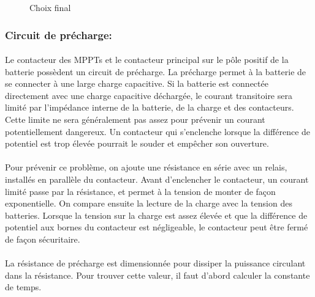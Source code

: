 		\begin{figure}[H]
			\centering
			\caption{Choix final}
			\label{fig:contactorsolfinal}
		\end{figure}

	\newpage

	\subsubsection*{Circuit de précharge:}
		\paragraph*{}
		Le contacteur des MPPTs et le contacteur principal sur le pôle positif de la batterie possèdent un circuit de précharge. La précharge permet à la batterie de se connecter à une large charge capacitive. Si la batterie est connectée directement avec une charge capacitive déchargée, le courant transitoire sera limité par l'impédance interne de la batterie, de la charge et des contacteurs. Cette limite ne sera généralement pas assez pour prévenir un courant potentiellement dangereux. Un contacteur qui s'enclenche lorsque la différence de potentiel est trop élevée pourrait le souder et empêcher son ouverture.
		
		\paragraph*{}
		Pour prévenir ce problème, on ajoute une résistance en série avec un relais, installés en parallèle du contacteur. Avant d'enclencher le contacteur, un courant limité passe par la résistance, et permet à la tension de monter de façon exponentielle. On compare ensuite la lecture de la charge avec la tension des batteries. Lorsque la tension sur la charge est assez élevée et que la différence de potentiel aux bornes du contacteur est négligeable, le contacteur peut être fermé de façon sécuritaire\cite{System_Approach}.
		
		\paragraph*{}		
		La résistance de précharge est dimensionnée pour dissiper la puissance circulant dans la résistance. Pour trouver cette valeur, il faut d'abord calculer la constante de temps\cite{LiIonBms}.
	
